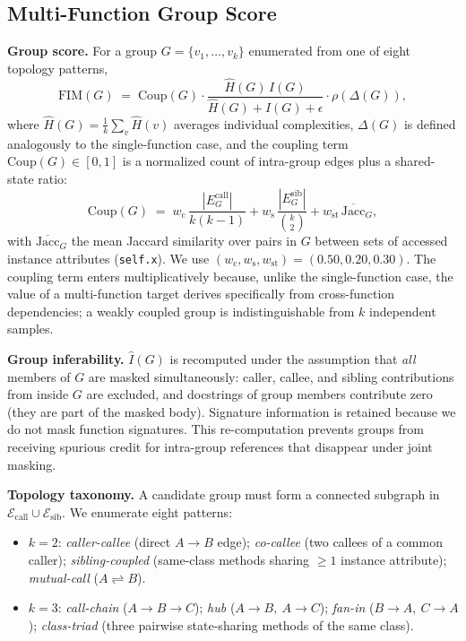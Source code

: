 \subsection{Multi-Function Group Score}
\label{app:algo:groups}

\textbf{Group score.}
For a group $G = \{v_1, \dots, v_k\}$ enumerated from one of eight
topology patterns,
\begin{equation}
  \mathrm{FIM}(G) \;=\;
  \mathrm{Coup}(G)
  \cdot
  \frac{\hat{H}(G)\,\hat{I}(G)}{\hat{H}(G) + \hat{I}(G) + \epsilon}
  \cdot
  \rho\!\left(\Delta(G)\right),
  \label{eq:fim_group}
\end{equation}
where $\hat{H}(G)=\tfrac{1}{k}\sum_v \hat{H}(v)$ averages individual
complexities, $\Delta(G)$ is defined analogously to the single-function
case, and the coupling term $\mathrm{Coup}(G)\in[0,1]$ is a normalized
count of intra-group edges plus a shared-state ratio:
\begin{equation}
  \mathrm{Coup}(G)
  \;=\; w_{\mathrm{c}}\,\frac{|E^{\text{call}}_G|}{k(k\!-\!1)}
   + w_{\mathrm{s}}\,\frac{|E^{\text{sib}}_G|}{\binom{k}{2}}
   + w_{\mathrm{st}}\,\overline{\mathrm{Jacc}}_G,
  \label{eq:coupling}
\end{equation}
with $\overline{\mathrm{Jacc}}_G$ the mean Jaccard similarity over pairs
in $G$ between sets of accessed instance attributes (\texttt{self.x}).
We use $(w_{\mathrm{c}}, w_{\mathrm{s}}, w_{\mathrm{st}}) = (0.50,
0.20, 0.30)$. The coupling term enters multiplicatively because, unlike
the single-function case, the value of a multi-function target derives
specifically from cross-function dependencies; a weakly coupled group
is indistinguishable from $k$ independent samples.

\textbf{Group inferability.}
$\hat{I}(G)$ is recomputed under the assumption that \emph{all} members
of $G$ are masked simultaneously: caller, callee, and sibling
contributions from inside $G$ are excluded, and docstrings of group
members contribute zero (they are part of the masked body). Signature
information is retained because we do not mask function signatures.
This re-computation prevents groups from receiving spurious credit for
intra-group references that disappear under joint masking.

\textbf{Topology taxonomy.}
A candidate group must form a connected subgraph in
$\mathcal{E}_{\mathrm{call}} \cup \mathcal{E}_{\mathrm{sib}}$. We
enumerate eight patterns:
\begin{itemize}\setlength\itemsep{0.1em}
  \item \emph{$k=2$}: \emph{caller-callee} (direct $A\!\to\!B$ edge);
  \emph{co-callee} (two callees of a common caller); \emph{sibling-coupled}
  (same-class methods sharing $\geq 1$ instance attribute);
  \emph{mutual-call} ($A\!\rightleftharpoons\!B$).
  \item \emph{$k=3$}: \emph{call-chain} ($A\!\to\!B\!\to\!C$); \emph{hub}
  ($A\!\to\!B,\ A\!\to\!C$); \emph{fan-in} ($B\!\to\!A,\ C\!\to\!A$);
  \emph{class-triad} (three pairwise state-sharing methods of the same
  class).
\end{itemize}

